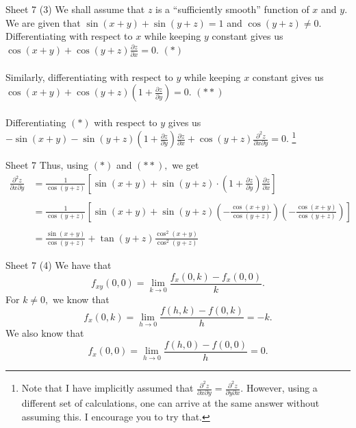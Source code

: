 \documentclass[handout, aspectratio=169]{beamer}
\begin{document}
\begin{frame}{Sheet 7}
	(3) We shall assume that $z$ is a ``sufficiently smooth'' function of $x$ and $y.$\\
	We are given that $\sin (x+y)+\sin (y+z)=1$ and $\cos (y+z) \neq 0.$\\ 
	Differentiating with respect to $x$ while keeping $y$ constant gives us $\cos (x+y)+\cos (y+z) \frac{\partial z}{\partial x}=0.$ \hfill $(*)$\\~\\
	Similarly, differentiating with respect to $y$ while keeping $x$ constant gives us $\cos (x+y)+\cos (y+z)\left(1+\frac{\partial z}{\partial y}\right)=0.$ \hfill $(**)$\\~\\
	Differentiating $(*)$ with respect to $y$ gives us $-\sin (x+y)-\sin (y+z)\left(1+\frac{\partial z}{\partial y}\right) \frac{\partial z}{\partial x}+\cos (y+z) \frac{\partial^{2} z}{\partial x \partial y}=0.$ \footnote{Note that I have implicitly assumed that $\frac{\partial^2z}{\partial x\partial y} = \frac{\partial^2z}{\partial y\partial x}.$ However, using a different set of calculations, one can arrive at the same answer without assuming this. I encourage you to try that.}
\end{frame}
\begin{frame}{Sheet 7}
	Thus, using $(*)$ and $(**),$ we get
	\begin{align*} \frac{\partial^{2} z}{\partial x \partial y} &=\frac{1}{\cos (y+z)}\left[\sin (x+y)+\sin (y+z) \cdot\left(1+\frac{\partial z}{\partial y}\right) \frac{\partial z}{\partial x}\right] \\~\\ &=\frac{1}{\cos (y+z)}\left[\sin (x+y)+\sin (y+z)\left(-\frac{\cos (x+y)}{\cos (y+z)}\right)\left(-\frac{\cos (x+y)}{\cos (y+z)}\right)\right] \\~\\ &=\frac{\sin (x+y)}{\cos (y+z)}+\tan (y+z) \frac{\cos ^{2}(x+y)}{\cos ^{2}(y+z)} \end{align*}
\end{frame}

\begin{frame}{Sheet 7}
	(4) We have that
	\[f_{x y}(0,0)=\lim _{k \rightarrow 0} \frac{f_{x}(0, k)-f_{x}(0,0)}{k}.\]
	For $k \neq 0,$ we know that
	\[f_{x}(0, k)=\lim _{h \rightarrow 0} \frac{f(h, k)-f(0, k)}{h}=-k.\]
	We also know that 
	\[f_{x}(0,0)=\lim _{h \rightarrow 0} \frac{f(h, 0)-f(0,0)}{h}=0.\]
\end{frame}
\end{document}
